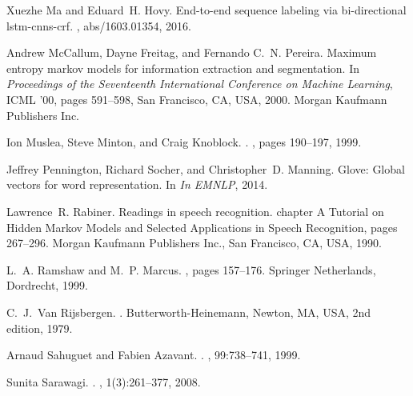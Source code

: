 \documentclass{nle}
\begin{document}
\begin{thebibliography}{}
Xuezhe Ma and Eduard~H. Hovy.
\newblock End-to-end sequence labeling via bi-directional lstm-cnns-crf.
, abs/1603.01354, 2016.

Andrew McCallum, Dayne Freitag, and Fernando C.~N. Pereira.
\newblock Maximum entropy markov models for information extraction and
  segmentation.
\newblock In {\em Proceedings of the Seventeenth International Conference on
  Machine Learning}, ICML '00, pages 591--598, San Francisco, CA, USA, 2000.
  Morgan Kaufmann Publishers Inc.

Ion Muslea, Steve Minton, and Craig Knoblock.
.
,
  pages 190--197, 1999.

Jeffrey Pennington, Richard Socher, and Christopher~D. Manning.
\newblock Glove: Global vectors for word representation.
\newblock In {\em In EMNLP}, 2014.

Lawrence~R. Rabiner.
\newblock Readings in speech recognition.
\newblock chapter A Tutorial on Hidden Markov Models and Selected Applications
  in Speech Recognition, pages 267--296. Morgan Kaufmann Publishers Inc., San
  Francisco, CA, USA, 1990.

L.~A. Ramshaw and M.~P. Marcus.
, pages
  157--176.
\newblock Springer Netherlands, Dordrecht, 1999.

C.~J.~Van Rijsbergen.
.
\newblock Butterworth-Heinemann, Newton, MA, USA, 2nd edition, 1979.

Arnaud Sahuguet and Fabien Azavant.
.
, 99:738--741, 1999.

Sunita Sarawagi.
.
, 1(3):261--377, 2008.


\end{thebibliography}
\end{document}
